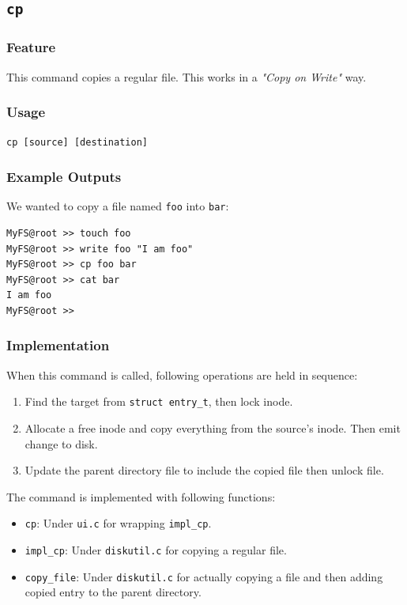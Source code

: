 \documentclass{homework}
\begin{document}
\subsection{\texttt{cp}}
\subsubsection{Feature}
This command copies a regular file. This works in a \textit{"Copy on Write"} way.
\subsubsection{Usage}
\begin{center}
\texttt{cp [source] [destination]}
\end{center}
\subsubsection{Example Outputs}
We wanted to copy a file named \texttt{foo} into \texttt{bar}:
\\
\begin{center}
\begin{code}
\begin{verbatim}
MyFS@root >> touch foo
MyFS@root >> write foo "I am foo"
MyFS@root >> cp foo bar
MyFS@root >> cat bar
I am foo
MyFS@root >>
\end{verbatim}
\end{code}
\end{center}

\subsubsection{Implementation}
When this command is called, following operations are held in sequence:
\begin{enumerate}
    \item Find the target from \texttt{struct entry_t}, then lock inode.
    \item Allocate a free inode and copy everything from the source's inode. Then emit change to disk.
    \item Update the parent directory file to include the copied file then unlock file.
\end{enumerate}

The command is implemented with following functions:
\begin{itemize}
    \item \texttt{cp}: Under \texttt{ui.c} for wrapping \texttt{impl_cp}.
    \item \texttt{impl_cp}: Under \texttt{diskutil.c} for copying a regular file.
    \item \texttt{copy_file}: Under \texttt{diskutil.c} for actually copying a file and then adding copied entry to the parent directory.
\end{itemize}
\end{document}
